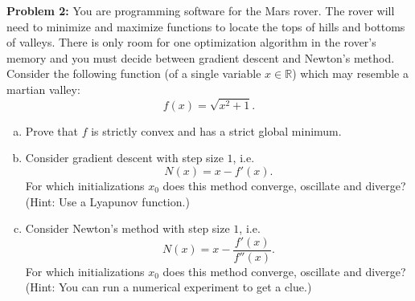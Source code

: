 \documentclass[12pt]{article}
\begin{document}
\newpage

{\bf Problem 2:} You are programming software for the Mars rover. The rover will need to minimize and maximize functions to locate the tops of hills and bottoms of valleys. There is only room for one optimization algorithm in the rover's memory and you must decide between gradient descent and Newton's method. Consider the following function (of a single variable $x \in \mathbb{R}$) which may resemble a martian valley:
\[ f(x) = \sqrt{x^2 + 1}.\]

\begin{enumerate}[(a)]
	\item Prove that $f$ is strictly convex and has a strict global minimum.
	
	\item Consider gradient descent with step size $1$, i.e. 
	\[N(x) = x - f'(x). \]
	For which initializations $x_0$ does this method converge, oscillate and diverge? (Hint: Use a Lyapunov function.)
	
	\item Consider Newton's method with step size $1$, i.e. 
	\[N(x) = x - \frac{f'(x)}{f''(x)}. \]
	For which initializations $x_0$ does this method converge, oscillate and diverge? (Hint: You can run a numerical experiment to get a clue.)
\end{enumerate}
\end{document}
